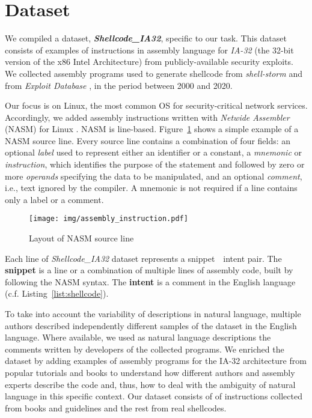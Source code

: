 \documentclass[11pt,a4paper]{article}
\newcommand{\datasetname}[1]{\emph{Shellcode\_IA32}}
\begin{document}
 
\section{Dataset}
\label{sec:dataset}
We compiled a dataset, \textbf{\datasetname{}}, specific to our task. This dataset consists of  examples of instructions in assembly language for \textit{IA-32} (the 32-bit version of the x86 Intel Architecture) from publicly-available security exploits. We collected assembly programs used to generate shellcode from \textit{shell-storm} \cite{shellstorm} and from \textit{Exploit Database} \cite{exploitdb}, in the period between 2000 and 2020.



Our focus is on Linux, the most common OS for security-critical network services. Accordingly, we added assembly instructions written with \textit{Netwide Assembler} (NASM) for Linux \cite{duntemann2000assembly}.
NASM is line-based. Figure~\ref{fig:assembly_instruction} shows a simple example of a NASM source line. Every source line contains a combination of four fields: an optional \textit{label} used to represent either an identifier or a constant, a \textit{mnemonic} or \textit{instruction}, which identifies the purpose of the statement and followed by zero or more \textit{operands} specifying the data to be manipulated, and an optional \textit{comment}, i.e., text ignored by the compiler. A mnemonic is not required if a line contains only a label or a comment. 
 
 \begin{figure}[h!]
    \centering
    \texttt{[image: img/assembly\_instruction.pdf]}
\caption{Layout of NASM source line}
    \label{fig:assembly_instruction}
\end{figure}

Each line of \datasetname{} dataset represents a snippet~\textendash~intent pair. The \textbf{snippet} is a line or a combination of multiple lines of assembly code, built by following the NASM syntax. The \textbf{intent} is a comment in the English language (c.f. Listing~\ref{list:shellcode}).

To take into account the variability of descriptions in natural language, multiple authors described independently different samples of the dataset in the English language. Where available, we used as natural language descriptions the comments written by developers of the collected programs. We enriched the dataset by adding examples of assembly programs for the IA-32 architecture from popular tutorials and books \cite{duntemann2011assembly, kusswurm2014modern, tutorialspoint} to understand how different authors and assembly experts describe the code and, thus, how to deal with the ambiguity of natural language in this specific context. 
Our dataset consists of  of instructions collected from books and guidelines and the rest from real shellcodes. 
\end{document}
